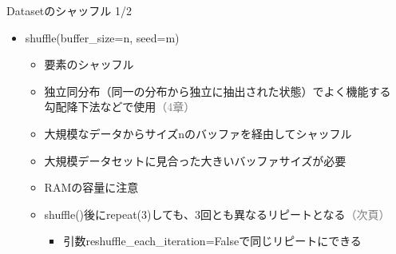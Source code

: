 \documentclass[aspectratio=169, dvipdfmx, 14pt, xcolor={svgnames,dvipsnames}, t]{beamer}
\begin{document}
\begin{frame}{Datasetのシャッフル 1/2}

  \begin{itemize}
    \tightlist
    \item
          shuffle(buffer\_size=n, seed=m)

          \begin{itemize}
            \tightlist
            \item
                  \alert{要素のシャッフル}
            \item
                  \alert{独立同分布（同一の分布から独立に抽出された状態）でよく機能する\\勾配降下法などで使用}\textcolor{gray}{（4章）}
            \item
                  大規模なデータからサイズnのバッファを経由してシャッフル
            \item
                  大規模データセットに見合った大きいバッファサイズが必要
            \item
                  RAMの容量に注意
            \item
                  shuffle()後にrepeat(3)しても、3回とも異なるリピートとなる\textcolor{gray}{（次頁）}

                  \begin{itemize}
                    \tightlist
                    \item
                          引数reshuffle\_each\_iteration=Falseで同じリピートにできる
                  \end{itemize}
          \end{itemize}
  \end{itemize}

\end{frame}

\end{document}
